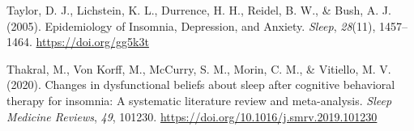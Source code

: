 \documentclass[
  ,doc,11pt, twoside,floatsintext]{apa6}
\newlength{\cslhangindent}
\newlength{\cslentryspacingunit} %
\newenvironment{CSLReferences}[2] %
 {%
  \setlength{\parindent}{0pt}
  \ifodd #1
  \let\oldpar\par
  \def\par{\hangindent=\cslhangindent\oldpar}
  \fi
  \setlength{\parskip}{#2\cslentryspacingunit}
 }%
 {}
\begin{document}
\begin{CSLReferences}{1}{0}
\leavevmode{}%
Taylor, D. J., Lichstein, K. L., Durrence, H. H., Reidel, B. W., \& Bush, A. J. (2005). Epidemiology of {Insomnia}, {Depression}, and {Anxiety}. \emph{Sleep}, \emph{28}(11), 1457--1464. \url{https://doi.org/gg5k3t}

\leavevmode{}%
Thakral, M., Von Korff, M., McCurry, S. M., Morin, C. M., \& Vitiello, M. V. (2020). Changes in dysfunctional beliefs about sleep after cognitive behavioral therapy for insomnia: {A} systematic literature review and meta-analysis. \emph{Sleep Medicine Reviews}, \emph{49}, 101230. \url{https://doi.org/10.1016/j.smrv.2019.101230}

\end{CSLReferences}


\clearpage
\end{document}
